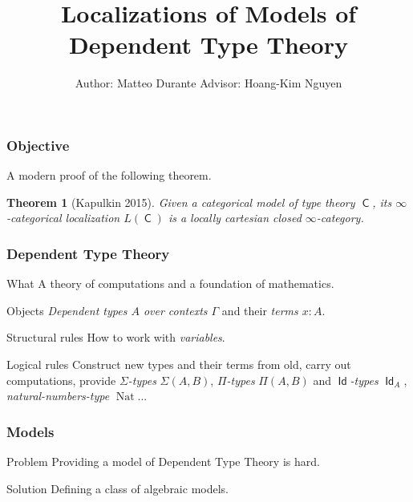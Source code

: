 \documentclass{beamer}
\title{Localizations of Models of Dependent Type Theory}
\author{Author: Matteo Durante \quad\quad\quad Advisor: Hoang-Kim Nguyen}
\institute{Regensburg University}
\DeclareMathOperator{\Id}{\mathsf{Id}}
\DeclareMathOperator{\sfC}{\mathsf{C}}
\DeclareMathOperator{\nat}{Nat}
\begin{document}
\theoremstyle{plain}

\newtheorem{thm}{Theorem}[section]
\newtheorem{prop}{Proposition}[section]
\newtheorem{defn}{Definition}[section]
\newtheorem{conj}{Conjecture}[section]
\newtheorem{lem}{Lemma}[section]

\frame{\titlepage}

\begin{frame}
  \frametitle{Objective}

  A modern proof of the following theorem.

  \begin{thm}[Kapulkin 2015]
    Given a categorical model of type theory $\sfC$, its $\infty$-categorical
    localization $L(\sfC)$ is a locally cartesian closed $\infty$-category.
  \end{thm}
\end{frame}

\begin{frame}
  \frametitle{Dependent Type Theory}
  
  \begin{block}{What}
    A theory of computations and a foundation of mathematics.
  \end{block}
  \pause

  \begin{block}{Objects}
    \emph{Dependent types $A$ over contexts
    $\Gamma$} and their \emph{terms $x:A$}.
  \end{block}
  \pause

  \begin{block}{Structural rules}
    How to work with \emph{variables}.
  \end{block}
  \pause

  \begin{block}{Logical rules}
    Construct new types and their terms from old, carry out
    computations, provide \emph{$\Sigma$-types} $\Sigma(A,B)$, \emph{$\Pi$-types}
    $\Pi(A,B)$ and \emph{$\Id$-types} $\Id_A$, \emph{natural-numbers-type}
    $\nat$...
  \end{block}
\end{frame}

\begin{frame}
  \frametitle{Models}

  \begin{block}{Problem}
    Providing a model of Dependent Type Theory is hard.
  \end{block}
  \pause

  \begin{block}{Solution}
    Defining a class of algebraic models.
  \end{block}
\end{frame}
\end{document}

